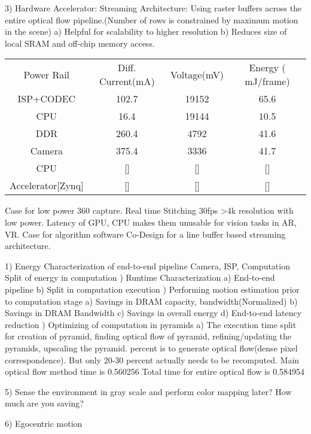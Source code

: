 3) Hardware Accelerator:
Streaming Architecture: Using raster buffers across the entire optical flow pipeline.(Number of rows is constrained by maximum motion in the scene)
a) Helpful for scalability to higher resolution
b) Reduces size of local SRAM and off-chip memory access.\newline

	\begin{tabular}{c|c|c|c}
	Power Rail & Diff. Current(mA) & Voltage(mV) & Energy ( mJ/frame) \\
	ISP+CODEC & 102.7 & 19152 & 65.6 \\
	CPU & 16.4 & 19144 & 10.5 \\
	DDR & 260.4 & 4792 & 41.6 \\
	Camera & 375.4 & 3336 & 41.7 \\
	CPU & [] & [] & [] \\
	Accelerator[Zynq] & [] & [] & [] \\
\end{tabular} \newline 


Case for low power 360 capture. Real time Stitching 30fps >4k resolution with low power. 
Latency of GPU, CPU makes them unusable for vision tasks in AR, VR.
Case for algorithm software Co-Design for a line buffer based streaming architecture. \newline


1) Energy Characterization of end-to-end pipeline\newline
Camera, ISP, Computation \newline
Split of energy in computation \newline
{}) Runtime Characterization \newline
a) End-to-end pipeline\newline
b) Split in computation execution\newline
{}) Performing motion estimation prior to computation stage\newline
a) Savings in DRAM capacity, bandwidth(Normalized) \newline
b) Savings in DRAM Bandwidth\newline
c) Savings in overall energy\newline
d) End-to-end latency reduction\newline
{}) Optimizing of computation in pyramids \newline
a) The execution time split for creation of pyramid, finding optical flow of pyramid, refining/updating the pyramids, upscaling the pyramid.  percent is to generate optical flow(dense pixel correspondence). But only 20-30 percent actually needs to be recomputed.\newline
Main optical flow method time is 0.560256
Total time for entire optical flow is 0.584954   
 

 5) Sense the environment in gray scale and perform color mapping later? How much are you saving? 
 
 6) Egocentric motion 
	



